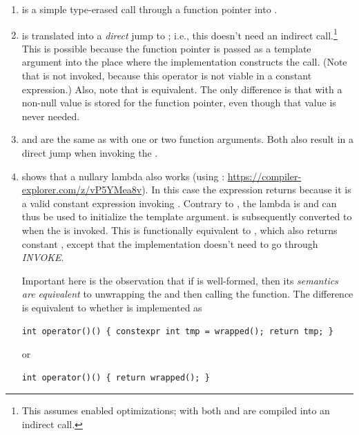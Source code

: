 \begin{enumerate}

  \item\label{en:nullary}
     is a simple type-erased call through a function pointer into .

  \item\label{en:cw:nullary}
     is translated into a \emph{direct} jump to ; i.e., this
    doesn't need an indirect call.\footnote{This assumes enabled optimizations; with  both
     and  are compiled into an indirect call.}
    This is possible because the function pointer is passed as a template argument into the place
    where the  implementation constructs the call.
    (Note that  is not invoked, because this operator is not
    viable in a constant expression.)
    Also, note that  is equivalent.
    The only difference is that with  a non-null value is stored for the function pointer,
    even though that value is never needed.

  \item\label{en:cw:unary}\label{en:cw:binary}
     and  are the same as  with one
    or two function arguments.
    Both also result in a direct jump when invoking the .

  \item\label{en:cw:lambda}
     shows that a nullary lambda also works (using
    : \url{https://compiler-explorer.com/z/vP5YMea8v}).
    In this case the expression  returns  because it is
    a valid constant expression invoking .
    Contrary to , the lambda is  and can thus be used to initialize
    the  template argument.
     is subsequently converted to  when the  is invoked.
    This is functionally equivalent to , which also
    returns constant , except that the implementation doesn't need to go through
    \textit{INVOKE}.

    Important here is the observation that if  is well-formed,
    then its \emph{semantics are equivalent} to unwrapping the  and then
    calling the function.
    The difference is equivalent to whether  is implemented as
    \medskip\begin{lstlisting}[style=Vc]
    int operator()() { constexpr int tmp = wrapped(); return tmp; }
    \end{lstlisting}
    or
    \medskip\begin{lstlisting}[style=Vc]
    int operator()() { return wrapped(); }
    \end{lstlisting}


\end{enumerate}
